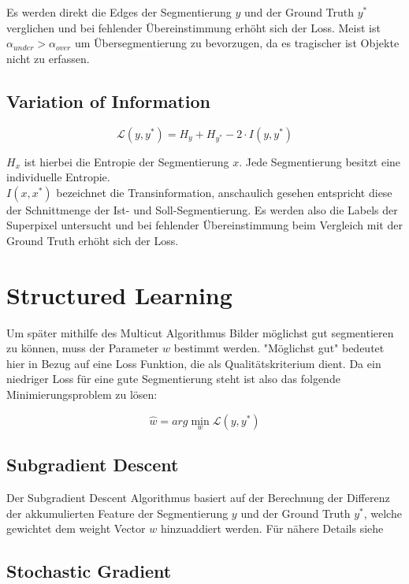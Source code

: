 Es werden direkt die Edges der Segmentierung $y$ und der Ground Truth $y^*$ verglichen und bei fehlender Übereinstimmung erhöht sich der Loss. Meist ist $\alpha_{under} > \alpha_{over}$ um Übersegmentierung zu bevorzugen, da es tragischer ist Objekte nicht zu erfassen.

\subsection{Variation of Information}

\begin{equation}
\mathcal{L}(y, y^*) = H_y + H_{y^*} - 2 \cdot I(y, y^*)
\end{equation}

$H_x$ ist hierbei die Entropie der Segmentierung $x$. Jede Segmentierung besitzt eine individuelle Entropie.  \\
$I(x, x^*)$ bezeichnet die Transinformation, anschaulich gesehen entspricht diese der Schnittmenge der Ist- und Soll-Segmentierung. 
Es werden also die Labels der Superpixel untersucht und bei fehlender Übereinstimmung beim Vergleich mit der Ground Truth erhöht sich der Loss.

\section{Structured Learning}\label{sec:strucLearn}

Um später mithilfe des Multicut Algorithmus Bilder möglichst gut segmentieren zu können, muss der Parameter $w$ bestimmt werden. "Möglichst gut" bedeutet hier in Bezug auf eine Loss Funktion, die als Qualitätskriterium dient. Da ein niedriger Loss für eine gute Segmentierung steht ist also das folgende Minimierungsproblem zu lösen:

\begin{equation}
\hat{w} = arg\min_{w} \mathcal{L}(y, y^*)
\end{equation}

\subsection{Subgradient Descent}

Der Subgradient Descent Algorithmus basiert auf der Berechnung der Differenz der akkumulierten Feature der Segmentierung $y$ und der Ground Truth $y^*$, welche gewichtet dem weight Vector $w$ hinzuaddiert werden. Für nähere Details siehe \cite{cit1}


\subsection{Stochastic Gradient}




